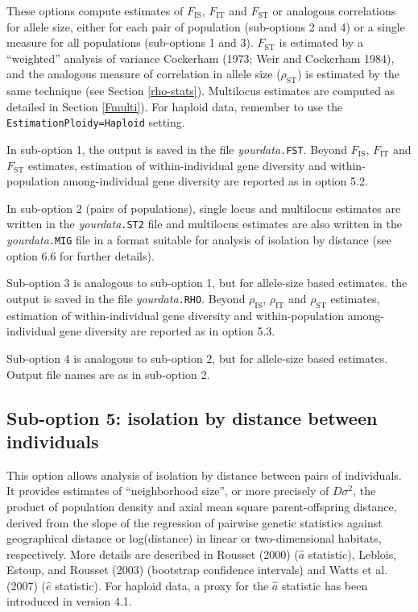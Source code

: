 \documentclass[12pt,]{book}
\theoremstyle{definition}
\theoremstyle{definition}
\theoremstyle{definition}
\theoremstyle{remark}
\begin{document}
These options compute estimates of \(F_\mathrm{IS}\), \(F_\mathrm{IT}\)
and \(F_\mathrm{ST}\) or analogous correlations for allele size, either
for each pair of population (sub-options 2 and 4) or a single measure
for all populations (sub-options 1 and 3). \(F_\mathrm{ST}\) is
estimated by a ``weighted'' analysis of variance Cockerham (1973; Weir
and Cockerham 1984), and the analogous measure of correlation in allele
size (\(\rho_\mathrm{ST}\)) is estimated by the same technique (see
Section \ref{rho-stats}). Multilocus estimates are computed as detailed
in Section \ref{Fmulti}). For haploid data, remember
to use the \texttt{EstimationPloidy=Haploid} setting.

In sub-option 1, the output is saved in the file
\emph{yourdata}\texttt{.FST}. Beyond \(F_\mathrm{IS}\),
\(F_\mathrm{IT}\) and \(F_\mathrm{ST}\) estimates, estimation of
within-individual gene diversity and within-population among-individual
gene diversity are reported as in option 5.2.

In sub-option 2 (pairs of populations), single locus and multilocus
estimates are written in the \emph{yourdata}\texttt{.ST2} file and
multilocus estimates are also written in the
\emph{yourdata}\texttt{.MIG} file in a format suitable for analysis of
isolation by distance (see option 6.6 for further details).

Sub-option 3 is analogous to sub-option 1, but for allele-size based
estimates. the output is saved in the file \emph{yourdata}\texttt{.RHO}.
Beyond \(\rho_\mathrm{IS}\), \(\rho_\mathrm{IT}\) and
\(\rho_\mathrm{ST}\) estimates, estimation of within-individual gene
diversity and within-population among-individual gene diversity are
reported as in option 5.3.

Sub-option 4 is analogous to sub-option 2, but for allele-size based
estimates. Output file names are as in sub-option 2.

\subsection{Sub-option 5: isolation by distance between
individuals}\label{sub-option-5-isolation-by-distance-between-individuals}

This option allows analysis of isolation by distance between pairs of
individuals. It provides estimates of ``neighborhood
size'', or more
precisely of \(D\sigma^2\), the product of population density and axial
mean square parent-offspring distance, derived from the slope of the
regression of pairwise genetic statistics against geographical distance
or log(distance) in linear or two-dimensional habitats, respectively.
More details are described in Rousset (2000) (\(\hat{a}\) statistic),
Leblois, Estoup, and Rousset (2003) (bootstrap confidence intervals) and
Watts et al. (2007) (\(\hat{e}\) statistic). For haploid data, a proxy
for the \(\hat{a}\) statistic has been introduced in version 4.1.
\end{document}
